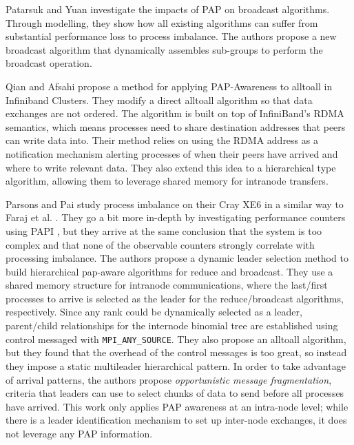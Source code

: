 Patarsuk and Yuan \cite{Patarasuk2008EffBcastDifProcArr} investigate the impacts of PAP on broadcast algorithms.
Through modelling, they show how all existing algorithms can suffer from substantial performance loss to process imbalance. 
The authors propose a new broadcast algorithm that dynamically assembles sub-groups to perform the broadcast operation.

Qian and Afsahi \cite{Qian2009ProcArrivalSHMA2AIB} propose a method for applying PAP-Awareness to alltoall in Infiniband Clusters.
They modify a direct alltoall algorithm so that data exchanges are not ordered.
The algorithm is built on top of InfiniBand's RDMA semantics, which means processes need to share destination addresses that peers can write data into. 
Their method relies on using the RDMA address as a notification mechanism alerting processes of when their peers have arrived and where to write relevant data.
They also extend this idea to a hierarchical type algorithm, allowing them to leverage shared memory for intranode transfers.

Parsons and Pai \cite{Parsons2015ExpProcImbMPICollHierarcialSys} study process imbalance on their Cray XE6 in a similar way to Faraj et al. \cite{Faraj2008StudyProcArrivalMPIColl}.
They go a bit more in-depth by investigating performance counters using PAPI \cite{Mucci1999PAPI}, but they arrive at the same conclusion that the system is too complex and that none of the observable counters strongly correlate with processing imbalance. 
The authors propose a dynamic leader selection method to build hierarchical pap-aware algorithms for reduce and broadcast.
They use a shared memory structure for intranode communications, where the last/first processes to arrive is selected as the leader for the reduce/broadcast algorithms, respectively. 
Since any rank could be dynamically selected as a leader, parent/child relationships for the internode binomial tree are established using control messaged with \texttt{MPI\_ANY\_SOURCE}. 
They also propose an alltoall algorithm, but they found that the overhead of the control messages is too great, so instead they impose a static multileader hierarchical pattern.
In order to take advantage of arrival patterns, the authors propose \textit{opportunistic message fragmentation}, criteria that leaders can use to select chunks of data to send before all processes have arrived.
This work only applies PAP awareness at an intra-node level; while there is a leader identification mechanism to set up inter-node exchanges, it does not leverage any PAP information.

